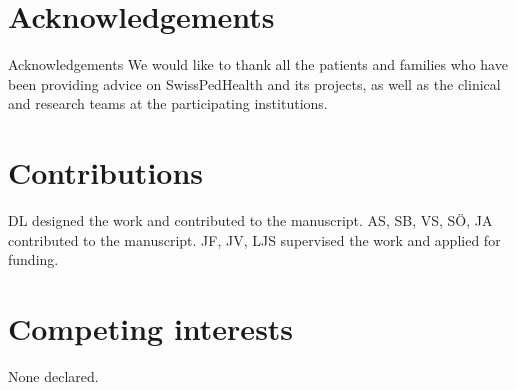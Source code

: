 \section{Acknowledgements}
Acknowledgements We would like to thank all the patients and families who have been providing advice on SwissPedHealth and its projects, as well as the clinical and research teams at the participating institutions.

\section{Contributions}
DL designed the work and contributed to the manuscript.
AS, SB, VS, SÖ, JA contributed to the manuscript.
JF, JV, LJS supervised the work and applied for funding.

\section{Competing interests}
None declared.

